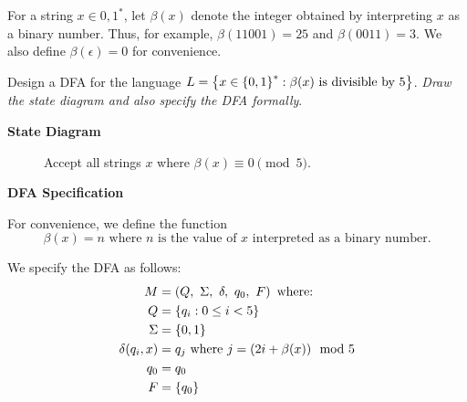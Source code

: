 \begin{problem}
  For a string $x \in {0, 1}^*$, let $\beta(x)$ denote the integer obtained
  by interpreting $x$ as a binary number.
  Thus, for example, $\beta(11001) = 25$ and $\beta(0011) = 3$.
  We also define $\beta(\epsilon) = 0$ for convenience.
  
  \noindent
  Design a DFA for the language $L = \left\{ x \in \left\{0, 1\right\}^* : \beta(x) \text{ is divisible by } 5\right\}$.
  \emph{Draw the state diagram and also specify the DFA formally}.

  \step
\end{problem}
\begin{Answer}
  \textbf{State Diagram}
  \begin{figure}[H]
    \centering
    \caption{Accept all strings $x$ where $\beta(x) \equiv 0 \pmod 5$.}
    \label{fig:divisible-by-5}
  \end{figure}

  \newpage
  \step
  \textbf{DFA Specification}

  \step
  For convenience, we define the function
  \[ \beta(x) = n \text{ where $n$ is the value of $x$ interpreted as a binary number.}\]
  
  \step
  We specify the DFA as follows:
  \begin{align*}
    M &= \left( Q,\ \Sigma,\ \delta,\ q_0,\ F \right) \text{ where: }\\
    Q &= \left\{q_i : 0 \le i < 5\right\}\\
    \Sigma &= \left\{0, 1\right\}\\
    \delta(q_i, x) &= q_j \text{ where } j = (2i + \beta(x)) \mod 5\\
    q_0 &= q_0\\
    F &= \left\{q_0\right\}
  \end{align*}

\end{Answer}
